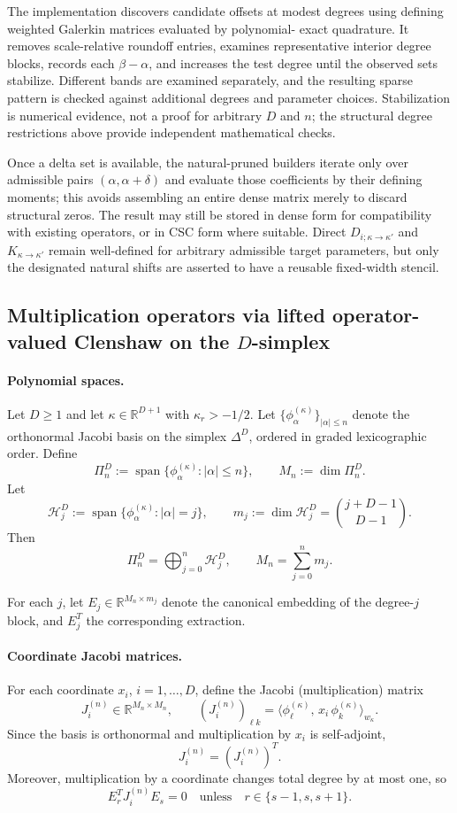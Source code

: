 \documentclass[11pt]{article}
\begin{document}
The implementation discovers candidate offsets at modest degrees
using defining weighted Galerkin matrices evaluated by polynomial-
exact quadrature.  It removes scale-relative roundoff entries,
examines representative interior degree blocks, records each
$\beta-\alpha$, and increases the test degree until the observed
sets stabilize.  Different bands are examined separately, and
the resulting sparse pattern is checked against additional degrees
and parameter choices.  Stabilization is numerical evidence, not a
proof for arbitrary $D$ and $n$; the structural degree restrictions
above provide independent mathematical checks.

Once a delta set is available, the natural-pruned builders iterate
only over admissible pairs $(\alpha,\alpha+\delta)$ and evaluate
those coefficients by their defining moments; this avoids assembling
an entire dense matrix merely to discard structural zeros.  The
result may still be stored in dense form for compatibility with
existing operators, or in CSC form where suitable.  Direct
$D_{i;\kappa\to\kappa'}$ and $K_{\kappa\to\kappa'}$ remain well-defined
for arbitrary admissible target parameters, but only the designated
natural shifts are asserted to have a reusable fixed-width stencil.

\subsection{Multiplication operators via lifted operator-valued Clenshaw on the $D$-simplex}

\paragraph{Polynomial spaces.}
Let $D\ge 1$ and let $\kappa\in\mathbb{R}^{D+1}$ with $\kappa_r>-1/2$.
Let $\{\phi_\alpha^{(\kappa)}\}_{|\alpha|\le n}$ denote the orthonormal Jacobi basis on the simplex
$\Delta^D$, ordered in graded lexicographic order.
Define
\[
\Pi_n^D := \operatorname{span}\{\phi_\alpha^{(\kappa)} : |\alpha|\le n\},
\qquad
M_n := \dim \Pi_n^D .
\]
Let
\[
\mathcal H_j^D := \operatorname{span}\{\phi_\alpha^{(\kappa)} : |\alpha|=j\},
\qquad
m_j := \dim \mathcal H_j^D = \binom{j+D-1}{D-1}.
\]
Then
\[
\Pi_n^D = \bigoplus_{j=0}^n \mathcal H_j^D,
\qquad
M_n = \sum_{j=0}^n m_j .
\]

For each $j$, let $E_j\in\mathbb{R}^{M_n\times m_j}$ denote the canonical embedding of the
degree-$j$ block, and $E_j^T$ the corresponding extraction.

\paragraph{Coordinate Jacobi matrices.}
For each coordinate $x_i$, $i=1,\dots,D$, define the Jacobi (multiplication) matrix
\[
J_i^{(n)} \in \mathbb{R}^{M_n\times M_n},
\qquad
(J_i^{(n)})_{\ell k}
=
\langle \phi_\ell^{(\kappa)},\, x_i\,\phi_k^{(\kappa)}\rangle_{w_\kappa}.
\]
Since the basis is orthonormal and multiplication by $x_i$ is self-adjoint,
\[
J_i^{(n)} = (J_i^{(n)})^T .
\]
Moreover, multiplication by a coordinate changes total degree by at most one, so
\[
E_r^T J_i^{(n)} E_s = 0
\quad\text{unless}\quad r\in\{s-1,s,s+1\}.
\]
\end{document}
